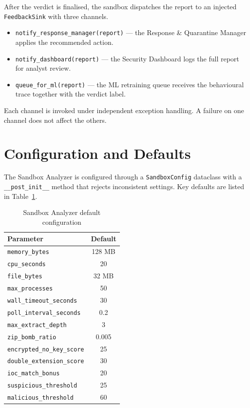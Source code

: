 \documentclass[12pt, a4paper]{report}
\begin{document}
After the verdict is finalised, the sandbox dispatches the report to
an injected \texttt{FeedbackSink} with three channels.

\begin{itemize}
    \item \texttt{notify\_response\_manager(report)} --- the
          Response \& Quarantine Manager applies the recommended
          action.
    \item \texttt{notify\_dashboard(report)} --- the Security
          Dashboard logs the full report for analyst review.
    \item \texttt{queue\_for\_ml(report)} --- the ML retraining queue
          receives the behavioural trace together with the verdict
          label.
\end{itemize}

Each channel is invoked under independent exception handling. A
failure on one channel does not affect the others.

\section{Configuration and Defaults}

The Sandbox Analyzer is configured through a \texttt{SandboxConfig}
dataclass with a \texttt{\_\_post\_init\_\_} method that rejects
inconsistent settings. Key defaults are listed in
Table~\ref{tab:sb_defaults}.

\begin{table}[H]
\centering
\caption{Sandbox Analyzer default configuration}
\label{tab:sb_defaults}
\begin{tabular}{|l|c|}
\hline
\textbf{Parameter} & \textbf{Default} \\
\hline
\texttt{memory\_bytes} & 128 MB \\
\hline
\texttt{cpu\_seconds} & 20 \\
\hline
\texttt{file\_bytes} & 32 MB \\
\hline
\texttt{max\_processes} & 50 \\
\hline
\texttt{wall\_timeout\_seconds} & 30 \\
\hline
\texttt{poll\_interval\_seconds} & 0.2 \\
\hline
\texttt{max\_extract\_depth} & 3 \\
\hline
\texttt{zip\_bomb\_ratio} & 0.005 \\
\hline
\texttt{encrypted\_no\_key\_score} & 25 \\
\hline
\texttt{double\_extension\_score} & 30 \\
\hline
\texttt{ioc\_match\_bonus} & 20 \\
\hline
\texttt{suspicious\_threshold} & 25 \\
\hline
\texttt{malicious\_threshold} & 60 \\
\hline
\end{tabular}
\end{table}
\end{document}
